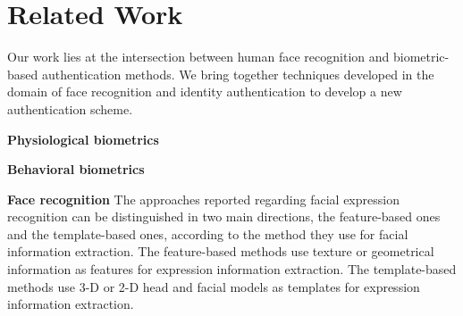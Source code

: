 \section{Related Work}
    Our work lies at the intersection between human face recognition and biometric-based authentication methods. We bring together techniques developed in the domain of face recognition and identity authentication to develop a new authentication scheme.

    \noindent \textbf{Physiological biometrics}

    \noindent \textbf{Behavioral biometrics}

    \noindent \textbf{Face recognition} The approaches reported regarding facial expression recognition can be distinguished in two main directions, the feature-based ones and the template-based ones, according to the method they use for facial information extraction. The feature-based methods use texture or geometrical information as features for expression information extraction. The template-based methods use 3-D or 2-D head and facial models as templates for expression information extraction.
